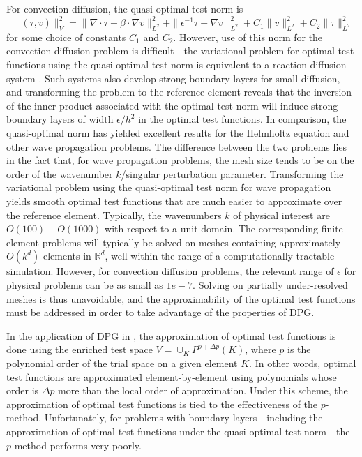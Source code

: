 \documentclass[11pt,onecolumn]{scrartcl}
\newcommand{\grad}{\nabla}
\renewcommand{\div}{\grad \cdot}
\begin{document}
For convection-diffusion, the quasi-optimal test norm is 
\[
\|\left(\tau, v\right)\|_V^2 = \| \div \tau - \beta \cdot \grad v
\|_{L^2}^2 + \| \epsilon^{-1} \tau + \grad v \|_{L^2}^2 +
C_1\|v\|_{L^2}^2 + C_2\|\tau\|_{L^2}^2
\]
for some choice of constants $C_1$ and $C_2$.  
However, use of this norm for the convection-diffusion problem is
difficult - the variational problem for optimal test functions using
the quasi-optimal test norm is equivalent to a reaction-diffusion
system \cite{DBLP:journals/procedia/NiemiCC11}.  Such systems also
develop strong boundary layers for small diffusion, and transforming
the problem to the reference element reveals that the inversion of the
inner product associated with the optimal test norm will induce strong
boundary layers of width $\epsilon/h^2$ in the optimal test functions.
In comparison, the quasi-optimal norm has yielded excellent results for the Helmholtz equation
and other wave propagation problems. The difference between the two
problems lies in the fact that, for wave propagation problems, the
mesh size tends to be on the order of the wavenumber $k$/singular
perturbation parameter. Transforming the variational problem using the
quasi-optimal test norm for wave propagation yields smooth optimal
test functions that are much easier to approximate over the reference
element. Typically, the wavenumbers $k$ of physical interest are
$O(100)-O(1000)$ with respect to a unit domain. The corresponding
finite element problems will typically be solved on meshes containing
approximately $O(k^d)$ elements in $\mathbb{R}^d$, well within the
range of a computationally tractable simulation. However, for
convection diffusion problems, the relevant range of $\epsilon$ for
physical problems can be as small as $1e-7$. Solving on partially
under-resolved meshes is thus unavoidable, and the approximability of
the optimal test functions must be addressed in order to take
advantage of the properties of DPG.

In the application of DPG in \cite{DPG1,DPG2,DPG3,DPG4}, the approximation of optimal test functions is done using the enriched test space $V = \cup_{K} P^{p+\Delta p}(K)$, where $p$ is the polynomial order of the trial space on a given element $K$.  In other words, optimal test functions are approximated element-by-element using polynomials whose order is $\Delta p$ more than the local order of approximation.  Under this scheme, the approximation of optimal test functions is tied to the effectiveness of the $p$-method.  Unfortunately, for problems with boundary layers - including the approximation of optimal test functions under the quasi-optimal test norm - the $p$-method performs very poorly.  
\end{document}
